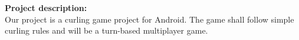 \textbf{Project description:} \\ 
Our project is a curling game project for Android. The game shall follow simple curling rules and will be a turn-based multiplayer game.\\